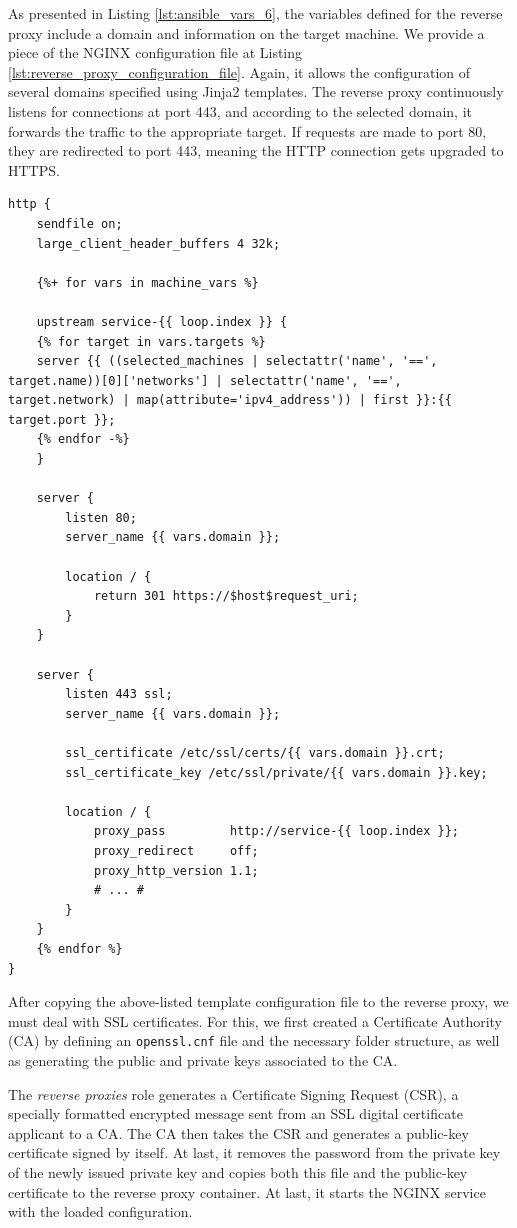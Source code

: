 As presented in Listing \ref{lst:ansible_vars_6}, the variables defined for the reverse proxy include a domain and information on the target machine. We provide a piece of the NGINX configuration file at Listing \ref{lst:reverse_proxy_configuration_file}. Again, it allows the configuration of several domains specified using Jinja2 templates. The reverse proxy continuously listens for connections at port 443, and according to the selected domain, it forwards the traffic to the appropriate target. If requests are made to port 80, they are redirected to port 443, meaning the HTTP connection gets upgraded to HTTPS.

\begin{lstlisting}[caption=Reverse Proxy Template Configuration.,numbers=none,label={lst:reverse_proxy_configuration_file}]
http {
    sendfile on;
    large_client_header_buffers 4 32k;

    {%+ for vars in machine_vars %}
    
    upstream service-{{ loop.index }} {
    {% for target in vars.targets %}
    server {{ ((selected_machines | selectattr('name', '==', target.name))[0]['networks'] | selectattr('name', '==', target.network) | map(attribute='ipv4_address')) | first }}:{{ target.port }};
    {% endfor -%}
    }

    server {
        listen 80;
        server_name {{ vars.domain }};

        location / {
            return 301 https://$host$request_uri;
        }
    }

    server {
        listen 443 ssl;
        server_name {{ vars.domain }};

        ssl_certificate /etc/ssl/certs/{{ vars.domain }}.crt;
        ssl_certificate_key /etc/ssl/private/{{ vars.domain }}.key;

        location / {
            proxy_pass         http://service-{{ loop.index }};
            proxy_redirect     off;
            proxy_http_version 1.1;
            # ... #
        }
    }
    {% endfor %}
}
\end{lstlisting}

After copying the above-listed template configuration file to the reverse proxy, we must deal with SSL certificates. For this, we first created a Certificate Authority (CA) by defining an \texttt{openssl.cnf} file and the necessary folder structure, as well as generating the public and private keys associated to the CA.

The \textit{reverse proxies} role generates a Certificate Signing Request (CSR), a specially formatted encrypted message sent from an SSL digital certificate applicant to a CA. The CA then takes the CSR and generates a public-key certificate signed by itself. At last, it removes the password from the private key of the newly issued private key and copies both this file and the public-key certificate to the reverse proxy container. At last, it starts the NGINX service with the loaded configuration. 

